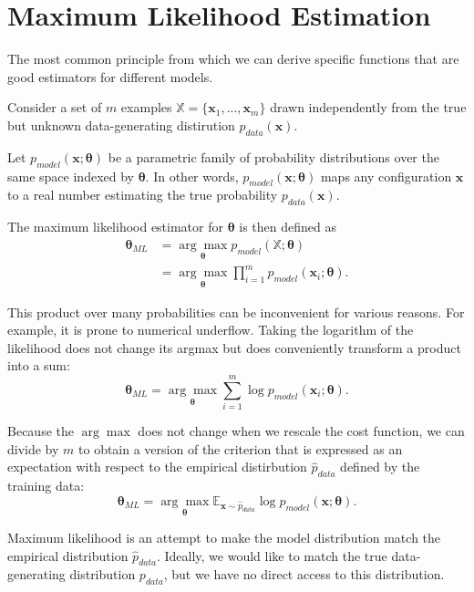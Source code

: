 \documentclass[11pt, twocolumn]{report}
\def\expectation{\mathbb{E}}
\def\parameter{\bm{\theta}}
\begin{document}
\section{Maximum Likelihood Estimation}
The most common principle from which we can derive specific functions that are
good estimators for different models.

Consider a set of $m$ examples $\mathbb{X} = \{\bm{x}_1,...,\bm{x}_m\}$ drawn
independently from the true but unknown data-generating distirution
$p_{data}(\bm{x})$.

Let $p_{model}(\bm{x};\parameter)$ be a parametric family of probability
distributions over the same space indexed by $\parameter$. In other words,
$p_{model}(\bm{x};\parameter)$ maps any configuration $\bm{x}$ to a real number
estimating the true probability $p_{data}(\bm{x})$.

The maximum likelihood estimator for $\parameter$ is then defined as
\begin{align}
  \parameter_{ML} &= \underset{\parameter}{\arg\max}
  p_{model}(\mathbb{X};\parameter)\\
  &= \underset{\parameter}{\arg\max} \prod_{i=1}^m
  p_{model}(\bm{x}_i;\parameter).
\end{align}

This product over many probabilities can be inconvenient for various reasons.
For example, it is prone to numerical underflow. Taking the logarithm of the
likelihood does not change its argmax but does conveniently transform a product
into a sum:
\begin{equation}
  \parameter_{ML} = \underset{\parameter}{\arg\max} \sum_{i=1}^m \log p_{model}
  (\bm{x}_i; \parameter).
\end{equation}

Because the $\arg\max$ does not change when we rescale the cost function, we
can divide by $m$ to obtain a version of the criterion that is expressed as an
expectation with respect to the empirical distirbution $\hat{p}_{data}$ defined
by the training data:
\begin{equation}
  \parameter_{ML} = \underset{\parameter}{\arg\max} \expectation_{\bm{x}
    \sim \hat{p}_{data}} \log p_{model} (\bm{x};\parameter).
\end{equation}

Maximum likelihood is an attempt to make the model distribution match the
empirical distribution $\hat{p}_{data}$. Ideally, we would like to match the
true data-generating distribution $p_{data}$, but we have no direct access to
this distribution.
\end{document}
